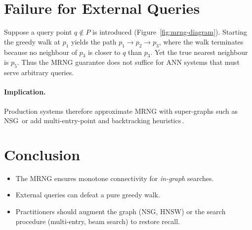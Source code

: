 \documentclass{article}
\begin{document}
\section{Failure for External Queries}
Suppose a query point $q\notin P$ is introduced (Figure~\ref{fig:mrng-diagram}). Starting the greedy walk at $p_1$ yields the path $p_1\rightarrow p_2\rightarrow p_3$, where the walk terminates because no neighbour of $p_3$ is closer to $q$ than $p_3$. Yet the true nearest neighbour is $p_5$. Thus the MRNG guarantee does not suffice for ANN systems that must serve arbitrary queries.

\paragraph{Implication.} Production systems therefore approximate MRNG with super\hyp graphs such as NSG\,\cite{fu2017nsg} or add multi\hyp entry\hyp point and backtracking heuristics\,\cite{zhu2021mrng}.

\section{Conclusion}
\begin{itemize}
  \item The MRNG ensures monotone connectivity for \emph{in\hyp graph} searches.
  \item External queries can defeat a pure greedy walk.
  \item Practitioners should augment the graph (NSG, HNSW) or the search procedure (multi\hyp entry, beam search) to restore recall.
\end{itemize}
\end{document}

